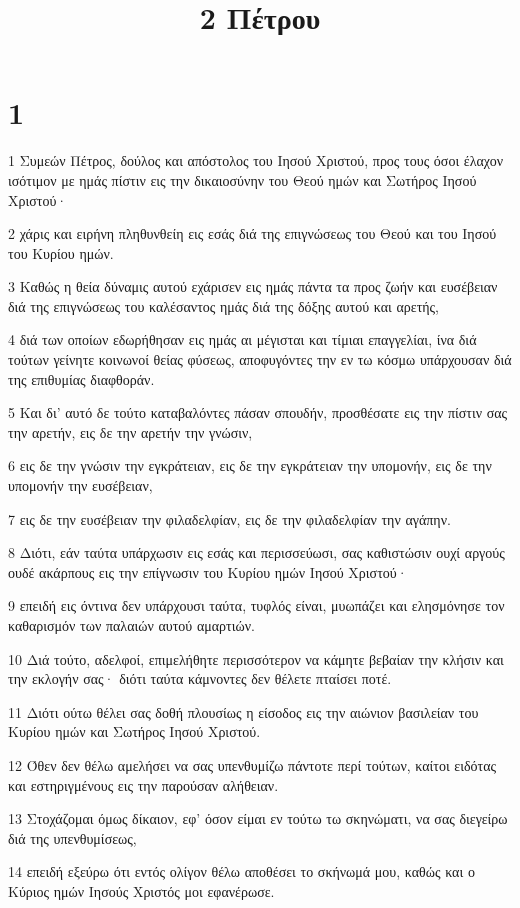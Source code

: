 

\title{2 Πέτρου}


\chapter{1}

\par 1 Συμεών Πέτρος, δούλος και απόστολος του Ιησού Χριστού, προς τους όσοι έλαχον ισότιμον με ημάς πίστιν εις την δικαιοσύνην του Θεού ημών και Σωτήρος Ιησού Χριστού·
\par 2 χάρις και ειρήνη πληθυνθείη εις εσάς διά της επιγνώσεως του Θεού και του Ιησού του Κυρίου ημών.
\par 3 Καθώς η θεία δύναμις αυτού εχάρισεν εις ημάς πάντα τα προς ζωήν και ευσέβειαν διά της επιγνώσεως του καλέσαντος ημάς διά της δόξης αυτού και αρετής,
\par 4 διά των οποίων εδωρήθησαν εις ημάς αι μέγισται και τίμιαι επαγγελίαι, ίνα διά τούτων γείνητε κοινωνοί θείας φύσεως, αποφυγόντες την εν τω κόσμω υπάρχουσαν διά της επιθυμίας διαφθοράν.
\par 5 Και δι' αυτό δε τούτο καταβαλόντες πάσαν σπουδήν, προσθέσατε εις την πίστιν σας την αρετήν, εις δε την αρετήν την γνώσιν,
\par 6 εις δε την γνώσιν την εγκράτειαν, εις δε την εγκράτειαν την υπομονήν, εις δε την υπομονήν την ευσέβειαν,
\par 7 εις δε την ευσέβειαν την φιλαδελφίαν, εις δε την φιλαδελφίαν την αγάπην.
\par 8 Διότι, εάν ταύτα υπάρχωσιν εις εσάς και περισσεύωσι, σας καθιστώσιν ουχί αργούς ουδέ ακάρπους εις την επίγνωσιν του Κυρίου ημών Ιησού Χριστού·
\par 9 επειδή εις όντινα δεν υπάρχουσι ταύτα, τυφλός είναι, μυωπάζει και ελησμόνησε τον καθαρισμόν των παλαιών αυτού αμαρτιών.
\par 10 Διά τούτο, αδελφοί, επιμελήθητε περισσότερον να κάμητε βεβαίαν την κλήσιν και την εκλογήν σας· διότι ταύτα κάμνοντες δεν θέλετε πταίσει ποτέ.
\par 11 Διότι ούτω θέλει σας δοθή πλουσίως η είσοδος εις την αιώνιον βασιλείαν του Κυρίου ημών και Σωτήρος Ιησού Χριστού.
\par 12 Όθεν δεν θέλω αμελήσει να σας υπενθυμίζω πάντοτε περί τούτων, καίτοι ειδότας και εστηριγμένους εις την παρούσαν αλήθειαν.
\par 13 Στοχάζομαι όμως δίκαιον, εφ' όσον είμαι εν τούτω τω σκηνώματι, να σας διεγείρω διά της υπενθυμίσεως,
\par 14 επειδή εξεύρω ότι εντός ολίγον θέλω αποθέσει το σκήνωμά μου, καθώς και ο Κύριος ημών Ιησούς Χριστός μοι εφανέρωσε.
